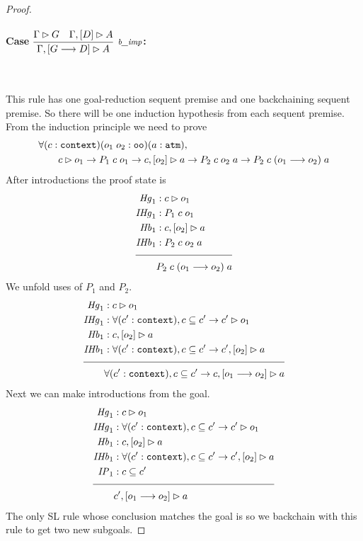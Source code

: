 \begin{proof}
\paragraph{Case $\vcenter{\rlbimp{}}$:} ~\\

\medskip

This rule has one goal-reduction sequent premise and one backchaining sequent premise. So there will be one induction hypothesis from each sequent premise. From the induction principle we need to prove 
\begin{align*}
& \forall (c : \sltm{context}) (o_1 \; o_2 : \sltm{oo}) (a : \sltm{atm}), \\
& \qquad \seqsl[c]{o_1} \rightarrow P_1 \; c \; o_1 \rightarrow \bchsl[c]{o_2}{a} \rightarrow P_2 \; c \; o_2 \; a \rightarrow P_2 \; c \; (o_1 \longrightarrow o_2) \; a
\end{align*}
After introductions the proof state is
\begin{align*}
\mathit{Hg}_1 &: \seqsl[c]{o_1} \\
\mathit{IHg}_1 &: P_1 \; c \; o_1 \\
\mathit{Hb}_1 &: \bchsl[c]{o_2}{a} \\
\mathit{IHb}_1 &: P_2 \; c \; o_2 \; a \\[\pfshift{}]
\cline{1-2}
& P_2 \; c \; (o_1 \longrightarrow o_2) \; a
\end{align*}
We unfold uses of $P_1$ and $P_2$.
\begin{align*}
\mathit{Hg}_1 &: \seqsl[c]{o_1} \\
\mathit{IHg}_1 &: \forall (\inddyncon{} : \sltm{context}), c \subseteq \inddyncon{} \rightarrow \seqsl[\inddyncon{}]{o_1} \\
\mathit{Hb}_1 &: \bchsl[c]{o_2}{a} \\
\mathit{IHb}_1 &: \forall (\inddyncon{} : \sltm{context}), c \subseteq \inddyncon{} \rightarrow \bchsl[\inddyncon{}]{o_2}{a} \\[\pfshift{}]
\cline{1-2}
& \forall (\inddyncon{} : \sltm{context}), c \subseteq \inddyncon{} \rightarrow \bchsl[c]{o_1 \longrightarrow o_2}{a}
\end{align*}
Next we can make introductions from the goal.
\begin{align*}
\mathit{Hg}_1 &: \seqsl[c]{o_1} \\
\mathit{IHg}_1 &: \forall (\inddyncon{} : \sltm{context}), c \subseteq \inddyncon{} \rightarrow \seqsl[\inddyncon{}]{o_1} \\
\mathit{Hb}_1 &: \bchsl[c]{o_2}{a} \\
\mathit{IHb}_1 &: \forall (\inddyncon{} : \sltm{context}), c \subseteq \inddyncon{} \rightarrow \bchsl[\inddyncon{}]{o_2}{a} \\
\mathit{IP}_1 &: c \subseteq \inddyncon{} \\[\pfshift{}]
\cline{1-2}
& \bchsl[\inddyncon{}]{o_1 \longrightarrow o_2}{a}
\end{align*}
The only SL rule whose conclusion matches the goal is \rlnmbimp{} so we backchain with this rule to get two new subgoals.


\end{proof}
